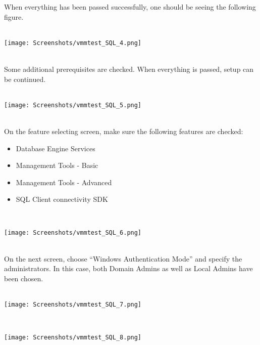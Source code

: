 When everything has been passed successfully, one should be seeing the following figure.
$\;$ \\ \\
\noindent\begin{minipage}{\textwidth}
    \centering
    \texttt{[image: Screenshots/vmmtest\_SQL\_4.png]}
\end{minipage}
$\;$ \\ \\
Some additional prerequisites are checked. When everything is passed, setup can be continued. 
$\;$ \\ \\
\noindent\begin{minipage}{\textwidth}
    \centering
    \texttt{[image: Screenshots/vmmtest\_SQL\_5.png]}
\end{minipage}
$\;$ \\ \\
On the feature selecting screen, make sure the following features are checked:
\begin{itemize}
\item Database Engine Services
\item Management Tools - Basic
\item Management Tools - Advanced
\item SQL Client connectivity SDK
\end{itemize}
$\;$ \\ \\
\noindent\begin{minipage}{\textwidth}
    \centering
    \texttt{[image: Screenshots/vmmtest\_SQL\_6.png]}
\end{minipage}
$\;$ \\ \\
On the next screen, choose ``Windows Authentication Mode'' and specify the administrators. In this case, both Domain Admins as well as Local Admins have been chosen.
$\;$ \\ \\
\noindent\begin{minipage}{\textwidth}
    \centering
    \texttt{[image: Screenshots/vmmtest\_SQL\_7.png]}
\end{minipage}
$\;$ \\ \\
\noindent\begin{minipage}{\textwidth}
    \centering
    \texttt{[image: Screenshots/vmmtest\_SQL\_8.png]}
\end{minipage}
$\;$ \\


